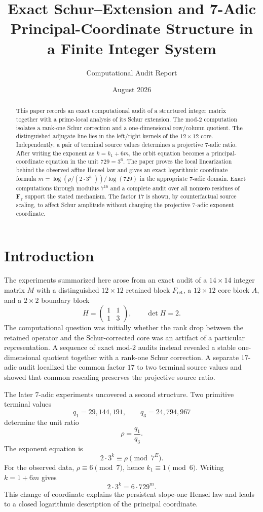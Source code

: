 \documentclass[11pt]{article}
\title{Exact Schur--Extension and 7-Adic Principal-Coordinate Structure in a Finite Integer System}
\author{Computational Audit Report}
\date{August 2026}
\theoremstyle{definition}
\theoremstyle{remark}
\begin{document}
\maketitle
\begin{abstract}
This paper records an exact computational audit of a structured integer matrix together with a prime-local analysis of its Schur extension. The mod-$2$ computation isolates a rank-one Schur correction and a one-dimensional row/column quotient. The distinguished adjugate line lies in the left/right kernels of the $12\times 12$ core. Independently, a pair of terminal source values determines a projective $7$-adic ratio. After writing the exponent as $k=k_1+6m$, the orbit equation becomes a principal-coordinate equation in the unit $729=3^6$. The paper proves the local linearization behind the observed affine Hensel law and gives an exact logarithmic coordinate formula $m=\log(\rho/(2\cdot3^{k_1}))/\log(729)$ in the appropriate $7$-adic domain. Exact computations through modulus $7^{16}$ and a complete audit over all nonzero residues of $\mathbf F_7$ support the stated mechanism. The factor $17$ is shown, by counterfactual source scaling, to affect Schur amplitude without changing the projective $7$-adic exponent coordinate.
\end{abstract}

\section{Introduction}
The experiments summarized here arose from an exact audit of a $14\times14$ integer matrix $M$ with a distinguished $12\times12$ retained block $F_{\mathrm{ret}}$, a $12\times12$ core block $A$, and a $2\times2$ boundary block
\[
H=\begin{pmatrix}1&1\\1&3\end{pmatrix},\qquad \det H=2.
\]
The computational question was initially whether the rank drop between the retained operator and the Schur-corrected core was an artifact of a particular representation. A sequence of exact mod-$2$ audits instead revealed a stable one-dimensional quotient together with a rank-one Schur correction. A separate $17$-adic audit localized the common factor $17$ to two terminal source values and showed that common rescaling preserves the projective source ratio.

The later $7$-adic experiments uncovered a second structure. Two primitive terminal values
\[
q_1=29{,}144{,}191,
\qquad
q_3=24{,}794{,}967
\]
determine the unit ratio
\[
\rho=\frac{q_1}{q_3}.
\]
The exponent equation is
\[
2\cdot3^k\equiv \rho \pmod{7^E}.
\]
For the observed data, $\rho\equiv6\pmod7$, hence $k_1\equiv1\pmod6$. Writing $k=1+6m$ gives
\[
2\cdot3^k=6\cdot729^m.
\]
This change of coordinate explains the persistent slope-one Hensel law and leads to a closed logarithmic description of the principal coordinate.
\end{document}
